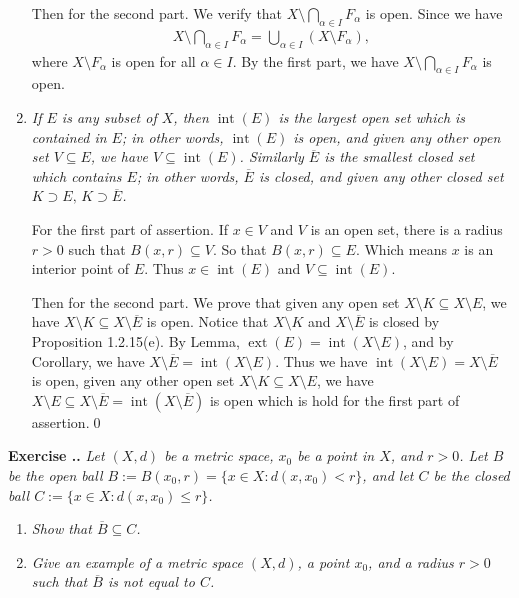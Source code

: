 \documentclass{book}
\DeclareMathOperator{\inte}{int}%
\DeclareMathOperator{\ext}{ext}%
\newcounter{Exercise}[section]
\renewcommand{\theExercise}{\thesection.\arabic{Exercise}.}
\newcommand{\new}{\vspace{1.5em}\noindent\textbf{Exercise \stepcounter{Exercise}\textbf{\theExercise}} }
\begin{document}
\begin{enumerate}
    Then for the second part. We verify that $X\setminus\bigcap_{\alpha\in I}F_\alpha$ is open. Since we have
        \begin{align*}
            X\setminus\bigcap_{\alpha\in I}F_\alpha=\bigcup_{\alpha\in I}(X\setminus F_\alpha),
        \end{align*}
    where $X\setminus F_\alpha$ is open for all $\alpha\in I$. By the first part, we have $X\setminus\bigcap_{\alpha\in I}F_\alpha$ is open.

    \item \emph{If $E$ is any subset of $X$, then $\inte(E)$ is the largest open set which is contained in $E$; in other words, $\inte(E)$ is open, and given any other open set $V\subseteq E$, we have $V\subseteq\inte(E)$. Similarly $\overline E$ is the smallest closed set which contains $E$; in other words, $\overline E$ is closed, and given any other closed set $K\supset E,\, K\supset\overline E$.}

    For the first part of assertion. If $x\in V$ and $V$ is an open set, there is a radius $r>0$ such that $B(x,r)\subseteq V$. So that $B(x,r)\subseteq E$. Which means $x$ is an interior point of $E$. Thus $x\in\inte(E)$ and $V\subseteq\inte(E)$.

    Then for the second part. We prove that given any open set $X\setminus K\subseteq X\setminus E$, we have $X\setminus K\subseteq X\setminus\overline E$ is open. Notice that $X\setminus K$ and $X\setminus\overline E$ is closed by Proposition 1.2.15(e). By Lemma, $\ext(E)=\inte(X\setminus E)$, and by Corollary, we have $X\setminus\overline E=\inte(X\setminus E)$. Thus we have $\inte(X\setminus E)=X\setminus\overline E$ is open, given any other open set $X\setminus K\subseteq X\setminus E$, we have $X\setminus E\subseteq X\setminus\overline E=\inte(X\setminus\overline E)$ is open which is hold for the first part of assertion.\qed
\end{enumerate}

\new\emph{Let $(X,d)$ be a metric space, $x_0$ be a point in $X$, and $r>0$. Let $B$ be the open ball $B:=B(x_0,r)=\{x\in X:d(x,x_0)<r\}$, and let $C$ be the closed ball $C:=\{x\in X:d(x,x_0)\leq r\}$.}
    \begin{enumerate}
        \item \emph{Show that $\overline B\subseteq C$.}
        \item \emph{Give an example of a metric space $(X,d)$, a point $x_0$, and a radius $r>0$ such that $\overline B$ is not equal to $C$.}
    \end{enumerate}
\end{document}
